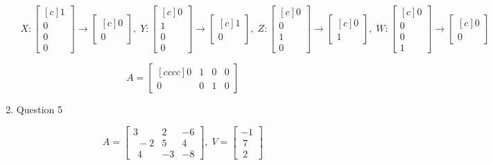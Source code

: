 \documentclass[a4paper,11pt]{article}
\begin{document}
\begin{preview}
\begin{enumerate}
        \begin{align*}
            X: \begin{bmatrix}[c] 1\\0\\0\\0 \end{bmatrix}
            \rightarrow \begin{bmatrix}[c] 0\\0 \end{bmatrix},\;
            Y: \begin{bmatrix}[c] 0\\1\\0\\0\end{bmatrix}
            \rightarrow \begin{bmatrix}[c] 1\\0 \end{bmatrix},\;
            Z: \begin{bmatrix}[c] 0\\0\\1\\0\end{bmatrix}
            \rightarrow \begin{bmatrix}[c] 0\\1 \end{bmatrix},\;
            W: \begin{bmatrix}[c] 0\\0\\0\\1\end{bmatrix}
            \rightarrow \begin{bmatrix}[c] 0\\0 \end{bmatrix}\\\\
        \end{align*}
        $$  A = \begin{bmatrix}[cccc] 0&1&0&0\\ 0&0&1&0 \end{bmatrix} $$

        \item Question 5

        $$ A = \begin{bmatrix}3&2&-6\\ \:\:-2&5&4\\ \:\:4&-3&-8\end{bmatrix} , \; V = \begin{bmatrix}-1\\ \:7\\ \:2\end{bmatrix}$$


\end{enumerate}
\end{preview}
\end{document}
